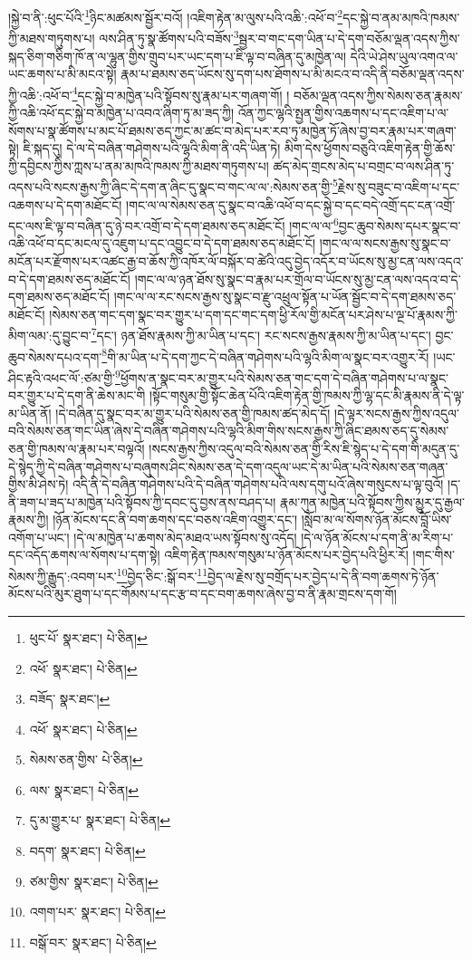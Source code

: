།སྐྱེ་བ་ནི་:ཕུང་པོའི་\footnote{ཕུང་པོ་  སྣར་ཐང་།  པེ་ཅིན། }ཉིང་མཚམས་སྦྱོར་བའོ། །འཇིག་རྟེན་མ་ལུས་པའི་འཆི་:འཕོ་བ་\footnote{འཕོ་  སྣར་ཐང་།  པེ་ཅིན། }དང་སྐྱེ་བ་ནམ་མཁའི་ཁམས་ཀྱི་མཐས་གཏུགས་པ། ལས་ཤིན་ཏུ་སྣ་ཚོགས་པའི་བཟོས་\footnote{བཟོད་  སྣར་ཐང་། }སྦྱར་བ་གང་དག་ཡིན་པ་དེ་དག་བཅོམ་ལྡན་འདས་ཀྱིས་སྐད་ཅིག་གཅིག་ཁོ་ན་ལ་ལྷུན་གྱིས་གྲུབ་པར་ཡང་དག་པ་ཇི་ལྟ་བ་བཞིན་དུ་མཁྱེན་ལ། དེའི་ཡེ་ཤེས་ཡུལ་འགའ་ལ་ཡང་ཆགས་པ་མི་མངའ་སྟེ། རྣམ་པ་ཐམས་ཅད་ཡོངས་སུ་དག་པས་ཐོགས་པ་མི་མངའ་བ་འདི་ནི་བཅོམ་ལྡན་འདས་ཀྱི་འཆི་:འཕོ་བ་\footnote{འཕོ་  སྣར་ཐང་།  པེ་ཅིན། }དང་སྐྱེ་བ་མཁྱེན་པའི་སྟོབས་སུ་རྣམ་པར་གཞག་གོ། །
བཅོམ་ལྡན་འདས་ཀྱིས་སེམས་ཅན་རྣམས་ཀྱི་འཆི་འཕོ་དང་སྐྱེ་བ་མཁྱེན་པ་འབའ་ཞིག་ཏུ་མ་ཟད་ཀྱི། འོན་ཀྱང་ལྷའི་སྤྱན་གྱིས་འཆགས་པ་དང་འཇིག་པ་ལ་སོགས་པ་སྣ་ཚོགས་པ་མང་པོ་ཐམས་ཅད་ཀྱང་མ་ཚང་བ་མེད་པར་རབ་ཏུ་མཁྱེན་ཏོ་ཞེས་བྱ་བར་རྣམ་པར་གཞག་སྟེ། ཇི་སྐད་དུ། དེ་ལ་དེ་བཞིན་གཤེགས་པའི་ལྷའི་མིག་ནི་འདི་ཡིན་ཏེ། མིག་དེས་ཕྱོགས་བཅུའི་འཇིག་རྟེན་གྱི་ཆོས་ཀྱི་དབྱིངས་ཀྱིས་ཀླས་པ་ནམ་མཁའི་ཁམས་ཀྱི་མཐས་གཏུགས་པ། ཚད་མེད་གྲངས་མེད་པ་བགྲང་བ་ལས་ཤིན་ཏུ་འདས་པའི་སངས་རྒྱས་ཀྱི་ཞིང་དེ་དག་ན་ཞིང་དུ་སྣང་བ་གང་ལ་ལ་:སེམས་ཅན་གྱི་\footnote{སེམས་ཅན་གྱིས་  པེ་ཅིན། }རྗེས་སུ་བཟུང་བ་འཇིག་པ་དང་འཆགས་པ་དེ་དག་མཐོང་ངོ། །གང་ལ་ལ་སེམས་ཅན་དུ་སྣང་བ་འཆི་འཕོ་བ་དང་སྐྱེ་བ་དང་བདེ་འགྲོ་དང་ངན་འགྲོ་དང་ལས་ཇི་ལྟ་བ་བཞིན་དུ་ཉེ་བར་འགྲོ་བ་དེ་དག་ཐམས་ཅད་མཐོང་ངོ། །གང་ལ་ལ་\footnote{ལས་  སྣར་ཐང་།  པེ་ཅིན། }བྱང་ཆུབ་སེམས་དཔར་སྣང་བ་འཆི་འཕོ་བ་དང་མངལ་དུ་འཇུག་པ་དང་འབྱུང་བ་དེ་དག་ཐམས་ཅད་མཐོང་ངོ། །གང་ལ་ལ་སངས་རྒྱས་སུ་སྣང་བ་མངོན་པར་རྫོགས་པར་འཚང་རྒྱ་བ་ཆོས་ཀྱི་འཁོར་ལོ་བསྐོར་བ་ཚེའི་འདུ་བྱེད་འདོར་བ་ཡོངས་སུ་མྱ་ངན་ལས་འདའ་བ་དེ་དག་ཐམས་ཅད་མཐོང་ངོ། །གང་ལ་ལ་ཉན་ཐོས་སུ་སྣང་བ་རྣམ་པར་གྲོལ་བ་ཡོངས་སུ་མྱ་ངན་ལས་འདའ་བ་དེ་དག་ཐམས་ཅད་མཐོང་ངོ། །གང་ལ་ལ་རང་སངས་རྒྱས་སུ་སྣང་བ་རྫུ་འཕྲུལ་སྟོན་པ་ཡོན་སྦྱོང་བ་དེ་དག་ཐམས་ཅད་མཐོང་ངོ། །སེམས་ཅན་གང་དག་སྣང་བར་གྱུར་པ་དག་དང་གང་དག་ཕྱི་རོལ་གྱི་མངོན་པར་ཤེས་པ་ལྔ་པོ་རྣམས་ཀྱི་མིག་ལམ་:དུ་བྱུང་བ་\footnote{དུ་མ་གྱུར་པ་  སྣར་ཐང་།  པེ་ཅིན། }དང་། ཉན་ཐོས་རྣམས་ཀྱི་མ་ཡིན་པ་དང་། རང་སངས་རྒྱས་རྣམས་ཀྱི་མ་ཡིན་པ་དང་། བྱང་ཆུབ་སེམས་དཔའ་དག་\footnote{བདག་  སྣར་ཐང་།  པེ་ཅིན། }གི་མ་ཡིན་པ་དེ་དག་ཀྱང་དེ་བཞིན་གཤེགས་པའི་ལྷའི་མིག་ལ་སྣང་བར་འགྱུར་རོ། །ཡང་ཤིང་རྟའི་འཕང་ལོ་:ཙམ་གྱི་\footnote{ཙམ་གྱིས་  སྣར་ཐང་།  པེ་ཅིན། }ཕྱོགས་ན་སྣང་བར་མ་གྱུར་པའི་སེམས་ཅན་གང་དག་དེ་བཞིན་གཤེགས་པ་ལ་སྣང་བར་གྱུར་པ་དེ་དག་ནི་ཆེས་མང་གི །སྟོང་གསུམ་གྱི་སྟོང་ཆེན་པོའི་འཇིག་རྟེན་གྱི་ཁམས་ཀྱི་ལྷ་དང་མི་རྣམས་ནི་དེ་ལྟ་མ་ཡིན་ནོ། །དེ་བཞིན་དུ་སྣང་བར་མ་གྱུར་པའི་སེམས་ཅན་གྱི་ཁམས་ཚད་མེད་དོ། །དེ་ལྟར་སངས་རྒྱས་ཀྱིས་འདུལ་བའི་སེམས་ཅན་གང་ཡིན་ཞེས་དེ་བཞིན་གཤེགས་པའི་ལྷའི་མིག་གིས་སངས་རྒྱས་ཀྱི་ཞིང་ཐམས་ཅད་དུ་སེམས་ཅན་གྱི་ཁམས་ལ་རྣམ་པར་བལྟའོ། །སངས་རྒྱས་ཀྱིས་འདུལ་བའི་སེམས་ཅན་གྱི་རིས་ཇི་སྙེད་པ་དེ་དག་གི་མདུན་དུ་དེ་སྙེད་ཀྱི་དེ་བཞིན་གཤེགས་པ་བཞུགས་ཤིང་སེམས་ཅན་དེ་དག་འདུལ་ཡང་དེ་མ་ཡིན་པའི་སེམས་ཅན་གཞན་གྱིས་མི་ཤེས་ཏེ། འདི་ནི་དེ་བཞིན་གཤེགས་པའི་དེ་བཞིན་གཤེགས་པའི་ལས་དགུ་པའོ་ཞེས་གསུངས་པ་ལྟ་བུའོ། །ད་ནི་ཟག་པ་ཟད་པ་མཁྱེན་པའི་སྟོབས་ཀྱི་དབང་དུ་བྱས་ནས་བཤད་པ། རྣམ་ཀུན་མཁྱེན་པའི་སྟོབས་ཀྱིས་མྱུར་དུ་རྒྱལ་རྣམས་ཀྱི། །ཉོན་མོངས་དང་ནི་བག་ཆགས་དང་བཅས་འཇིག་འགྱུར་དང་། །སློབ་མ་ལ་སོགས་ཉོན་མོངས་བློ་ཡིས་འགོག་པ་ཡང་། །དེ་ལ་མཁྱེན་པ་ཆགས་མེད་མཐའ་ཡས་སྟོབས་སུ་འདོད། །དེ་ལ་ཉོན་མོངས་པ་དག་ནི་མ་རིག་པ་དང་འདོད་ཆགས་ལ་སོགས་པ་དག་སྟེ། འཇིག་རྟེན་ཁམས་གསུམ་པ་ཉོན་མོངས་པར་བྱེད་པའི་ཕྱིར་རོ། །གང་གིས་སེམས་ཀྱི་རྒྱུད་:འབག་པར་\footnote{འགག་པར་  སྣར་ཐང་།  པེ་ཅིན། }བྱེད་ཅིང་:སྒོ་བར་\footnote{བསྒོ་བར་  སྣར་ཐང་།  པེ་ཅིན། }བྱེད་ལ་རྗེས་སུ་བགྲོད་པར་བྱེད་པ་དེ་ནི་བག་ཆགས་ཏེ་ཉོན་མོངས་པའི་མུར་ཐུག་པ་དང་གོམས་པ་དང་རྩ་བ་དང་བག་ཆགས་ཞེས་བྱ་བ་ནི་རྣམ་གྲངས་དག་གོ། 